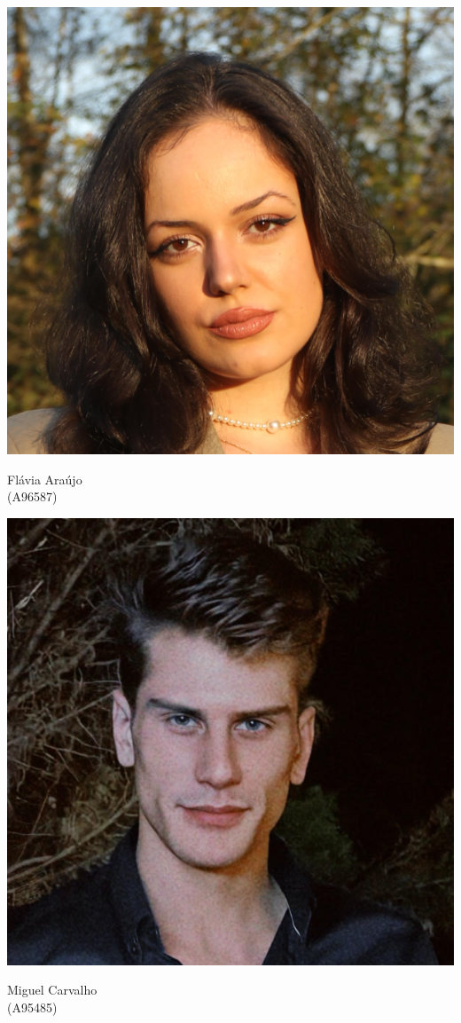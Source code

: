 {\begin{center}
    \begin{minipage}{120pt}
        \includegraphics[scale=0.2]{images/team/flavia.png}
        \parbox{120pt}{\centering\normalsize{Flávia Araújo \\ (A96587)}}
    \end{minipage}
    \hspace{0.5cm}
    \begin{minipage}{120pt}
        \includegraphics[scale=0.2]{images/team/miguel.png}
        \parbox{120pt}{\centering\normalsize{Miguel Carvalho \\ (A95485)}}
    \end{minipage}
\end{center}

}
